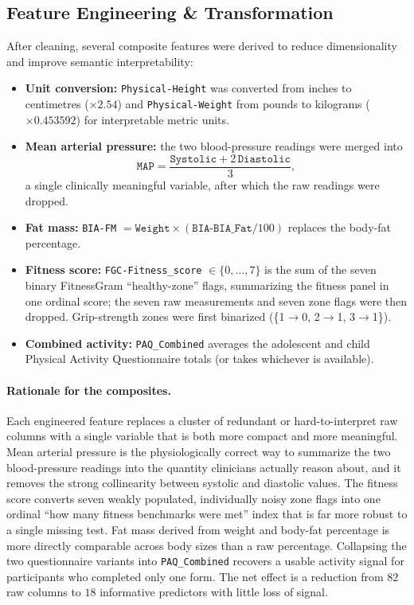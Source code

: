 \subsection{Feature Engineering \& Transformation}
After cleaning, several composite features were derived to reduce dimensionality and improve semantic interpretability:
\begin{itemize}
    \item \textbf{Unit conversion:} \texttt{Physical-Height} was converted from inches to centimetres ($\times 2.54$) and \texttt{Physical-Weight} from pounds to kilograms ($\times 0.453592$) for interpretable metric units.
    \item \textbf{Mean arterial pressure:} the two blood-pressure readings were merged into
    \[
    \texttt{MAP} = \frac{\texttt{Systolic} + 2\,\texttt{Diastolic}}{3},
    \]
    a single clinically meaningful variable, after which the raw readings were dropped.
    \item \textbf{Fat mass:} \texttt{BIA-FM} $= \texttt{Weight}\times(\texttt{BIA-BIA\_Fat}/100)$ replaces the body-fat percentage.
    \item \textbf{Fitness score:} \texttt{FGC-Fitness\_score} $\in\{0,\dots,7\}$ is the sum of the seven binary FitnessGram ``healthy-zone'' flags, summarizing the fitness panel in one ordinal score; the seven raw measurements and seven zone flags were then dropped. Grip-strength zones were first binarized (\{1$\to$0, 2$\to$1, 3$\to$1\}).
    \item \textbf{Combined activity:} \texttt{PAQ\_Combined} averages the adolescent and child Physical Activity Questionnaire totals (or takes whichever is available).
\end{itemize}
\paragraph{Rationale for the composites.} Each engineered feature replaces a cluster of redundant or hard-to-interpret raw columns with a single variable that is both more compact and more meaningful. Mean arterial pressure is the physiologically correct way to summarize the two blood-pressure readings into the quantity clinicians actually reason about, and it removes the strong collinearity between systolic and diastolic values. The fitness score converts seven weakly populated, individually noisy zone flags into one ordinal ``how many fitness benchmarks were met'' index that is far more robust to a single missing test. Fat mass derived from weight and body-fat percentage is more directly comparable across body sizes than a raw percentage. Collapsing the two questionnaire variants into \texttt{PAQ\_Combined} recovers a usable activity signal for participants who completed only one form. The net effect is a reduction from $82$ raw columns to $18$ informative predictors with little loss of signal.\\

